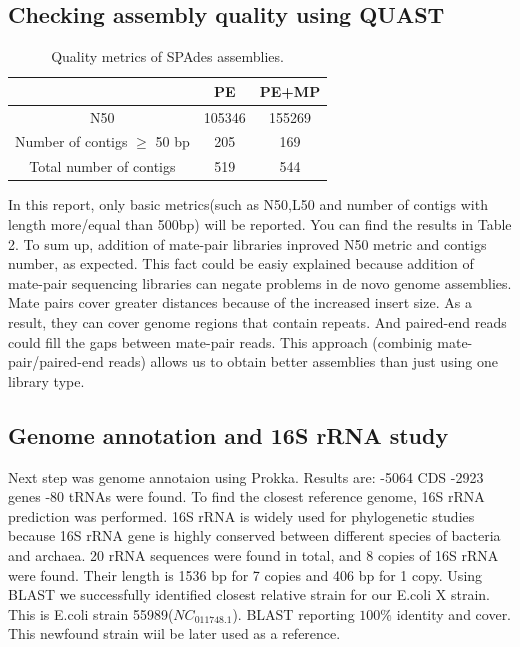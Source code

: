 \documentclass{article}
\begin{document}
\subsection{ Checking assembly quality using QUAST}
	\begin{table} 
	\centering
	\begin{tabular}{|c|c|c|}
		\hline
		 & PE & PE+MP   \\
		\hline
		N50   & 105346  & 155269 \\
		\hline
		Number of contigs $\geq$ 50 bp & 205 & 169\\
		\hline
		Total number of contigs & 519 &  544 \\
		\hline
	\end{tabular}
	\caption{  Quality metrics of SPAdes assemblies. }
	\label{tab:2}
\end{table}
In this report, only basic metrics(such as N50,L50 and number of contigs with length more/equal than 500bp) will be reported. You can find the results in Table 2.
To sum up, addition of mate-pair libraries inproved N50 metric and contigs number, as expected. This fact could be easiy explained because addition of mate-pair sequencing libraries can negate problems in de novo genome assemblies. Mate pairs cover greater distances because of the increased insert size. As a result, they can cover genome regions that contain repeats. And  paired-end reads could fill the gaps between mate-pair reads. This approach (combinig mate-pair/paired-end reads) allows us to obtain better assemblies than just using one library type.
\subsection{Genome annotation and 16S rRNA study}
Next step was genome annotaion using Prokka. Results are:
-5064 CDS
-2923 genes
-80 tRNAs were found.
To find the closest reference genome, 16S rRNA prediction was performed. 16S rRNA is widely used for phylogenetic studies because 16S rRNA gene is highly conserved between different species of bacteria and archaea.
20 rRNA sequences were found in total, and 8 copies of 16S rRNA were found. Their length is 1536 bp for 7 copies and 406 bp for 1 copy. Using BLAST we successfully identified closest relative strain for our E.coli X strain. This is E.coli strain 55989($NC_011748.1$). BLAST reporting $100\%$ identity and cover. This newfound strain wiil be later used as a reference.
\end{document}

